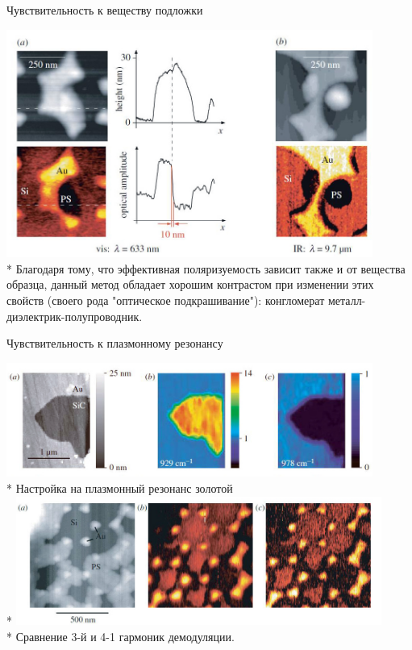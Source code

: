 \documentclass[9pt, compress, xcolor=table]{beamer}
\begin{document}
\begin{frame}{Чувствительность к веществу подложки}

\begin{center}
\includegraphics[width=0.9\textwidth]{nfm10}
\\* 
Благодаря тому, что эффективная поляризуемость зависит также и от вещества образца, данный метод обладает хорошим контрастом при изменении этих свойств (своего рода "оптическое подкрашивание"): конгломерат металл-диэлектрик-полупроводник.
\end{center}

\end{frame}

\begin{frame}{Чувствительность к плазмонному резонансу}

\begin{center}
\includegraphics[width=0.9\textwidth]{nfm12}
\\* Настройка на плазмонный резонанс золотой
\\*
\includegraphics[width=0.9\textwidth]{nfm11}
\\* Сравнение 3-й и 4-1 гармоник демодуляции.
\end{center}

\end{frame}
\end{document}
